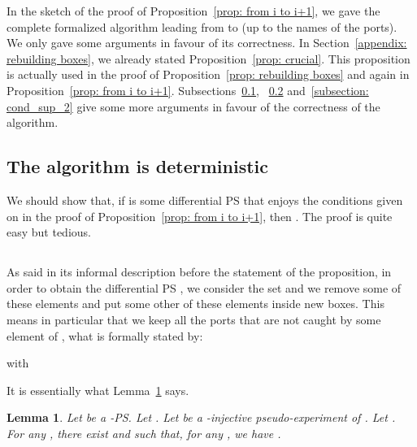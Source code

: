\documentclass{article}
\theoremstyle{plain}
\newtheorem{lem}[theorem]{Lemma}
\begin{document}
In the sketch of the proof of Proposition~\ref{prop: from i to i+1}, we gave the complete formalized algorithm leading from  to  (up to the names of the ports). We only gave some arguments in favour of its correctness. In Section~\ref{appendix: rebuilding boxes}, we already stated Proposition~\ref{prop: crucial}. This proposition is actually used in the proof of Proposition~\ref{prop: rebuilding boxes} and again in Proposition~\ref{prop: from i to i+1}. Subsections~\ref{subsection: deterministic}, ~\ref{subsection: cond_sup_1} and~\ref{subsection: cond_sup_2} give some more arguments in favour of the correctness of the algorithm. 

\subsection{The algorithm is deterministic}\label{subsection: deterministic}

We should show that, if  is some differential PS that enjoys the conditions given on  in the proof of Proposition~\ref{prop: from i to i+1}, then . The proof is quite easy but tedious.

\subsection{}\label{subsection: cond_sup_1}

As said in its informal description before the statement of the proposition, in order to obtain the differential PS , we consider the set  and we remove some of these elements and put some other of these elements inside new boxes. This means in particular that we keep all the ports that are not caught by some element of , what is formally stated by:

with 


It is essentially what Lemma~\ref{lem: P_k subseteq ports of taylor} says. 



\begin{lem}\label{lem: P_k subseteq ports of taylor}
Let  be a -PS. Let . 
Let  be a -injective pseudo-experiment of . Let . For any , there exist  and  such that, for any , we have .
\end{lem}
\end{document}
